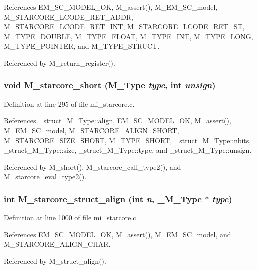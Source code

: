 References EM\_\-SC\_\-MODEL\_\-OK, M\_\-assert(), M\_\-EM\_\-SC\_\-model, M\_\-STARCORE\_\-LCODE\_\-RET\_\-ADDR, M\_\-STARCORE\_\-LCODE\_\-RET\_\-INT, M\_\-STARCORE\_\-LCODE\_\-RET\_\-ST, M\_\-TYPE\_\-DOUBLE, M\_\-TYPE\_\-FLOAT, M\_\-TYPE\_\-INT, M\_\-TYPE\_\-LONG, M\_\-TYPE\_\-POINTER, and M\_\-TYPE\_\-STRUCT.

Referenced by M\_\-return\_\-register().
\subsubsection{\setlength{\rightskip}{0pt plus 5cm}void M\_\-starcore\_\-short (\bf{M\_\-Type} {\em type}, int {\em unsign})}\label{mi__starcore_8c_9894dd539380baa9897d9beaa0789f56}




Definition at line 295 of file mi\_\-starcore.c.

References \_\-struct\_\-M\_\-Type::align, EM\_\-SC\_\-MODEL\_\-OK, M\_\-assert(), M\_\-EM\_\-SC\_\-model, M\_\-STARCORE\_\-ALIGN\_\-SHORT, M\_\-STARCORE\_\-SIZE\_\-SHORT, M\_\-TYPE\_\-SHORT, \_\-struct\_\-M\_\-Type::nbits, \_\-struct\_\-M\_\-Type::size, \_\-struct\_\-M\_\-Type::type, and \_\-struct\_\-M\_\-Type::unsign.

Referenced by M\_\-short(), M\_\-starcore\_\-call\_\-type2(), and M\_\-starcore\_\-eval\_\-type2().
\subsubsection{\setlength{\rightskip}{0pt plus 5cm}int M\_\-starcore\_\-struct\_\-align (int {\em n}, \bf{\_\-M\_\-Type} $\ast$ {\em type})}\label{mi__starcore_8c_415d3b3506c6260bbc115242a3de7f22}




Definition at line 1000 of file mi\_\-starcore.c.

References EM\_\-SC\_\-MODEL\_\-OK, M\_\-assert(), M\_\-EM\_\-SC\_\-model, and M\_\-STARCORE\_\-ALIGN\_\-CHAR.

Referenced by M\_\-struct\_\-align().
